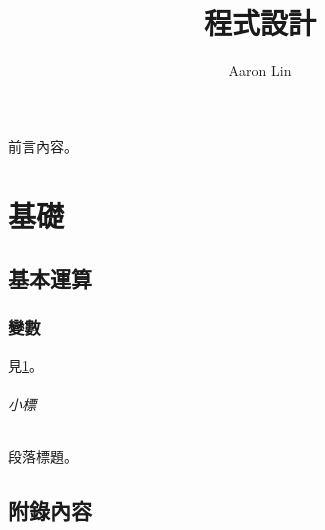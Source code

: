 \documentclass[lang=zh, twoside, chaptername={第 * 講}]{akizumi-book}
\title{程式設計}
\author{Aaron Lin}
\begin{document}
\frontmatter
\maketitle
\preface
前言內容。
\tableofcontents

\mainmatter
\part{基礎}
\chapter[sub=Basic Operations]{基本運算}\label{ch:basic}
\section{變數}
見\cref{ch:basic}。
\paragraph{小標} 段落標題。

\appendix
\chapter{附錄內容}
\end{document}
